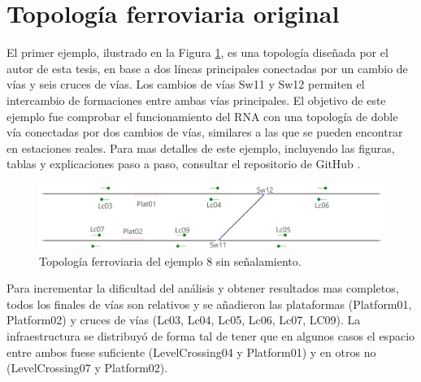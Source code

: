 \section{Topología ferroviaria original}

	El primer ejemplo, ilustrado en la Figura \ref{fig:EJ8_1}, es una topología diseñada por el autor de esta tesis, en base a dos líneas principales conectadas por un cambio de vías y seis cruces de vías. Los cambios de vías Sw11 y Sw12 permiten el intercambio de formaciones entre ambas vías principales. El objetivo de este ejemplo fue comprobar el funcionamiento del RNA con una topología de doble vía conectadas por dos cambios de vías, similares a las que se pueden encontrar en estaciones reales. Para mas detalles de este ejemplo, incluyendo las figuras, tablas y explicaciones paso a paso, consultar el repositorio de GitHub \cite{GITHUB_PHD}.
	
	\begin{figure}[h]
		\centering
		\includegraphics[width=1\textwidth]{resultados-obtenidos/ejemplo8/images/8_empty.png}
		\centering\caption{Topología ferroviaria del ejemplo 8 sin señalamiento.}
		\label{fig:EJ8_1}
	\end{figure}
	
	Para incrementar la dificultad del análisis y obtener resultados mas completos, todos los finales de vías son relativos y se añadieron las plataformas (Platform01, Platform02) y cruces de vías (Lc03, Lc04, Lc05, Lc06, Lc07, LC09). La infraestructura se distribuyó de forma tal de tener que en algunos casos el espacio entre ambos fuese suficiente (LevelCrossing04 y Platform01) y en otros no (LevelCrossing07 y Platform02).
